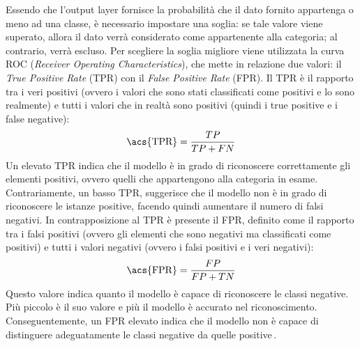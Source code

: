 Essendo che l'output layer fornisce la probabilità che il dato fornito appartenga o meno ad una classe, è necessario impostare una soglia: se tale valore viene superato, allora il dato verrà considerato come appartenente alla categoria; al contrario, verrà escluso. Per scegliere la soglia migliore viene utilizzata la curva \acs{ROC} (\textit{Receiver Operating Characteristics}), che mette in relazione due valori: il \textit{True Positive Rate} (\acs{TPR}) con il \textit{False Positive Rate} (\acs{FPR}). Il \acs{TPR} è il rapporto tra i veri positivi (ovvero i valori che sono stati classificati come positivi e lo sono realmente) e tutti i valori che in realtà sono positivi (quindi i true positive e i false negative):
% 
\begin{gather*}
    \text{\acs{TPR}} = \frac{TP}{TP + FN}
\end{gather*}
% 
\noindent Un elevato \acs{TPR} indica che il modello è in grado di riconoscere correttamente gli elementi positivi, ovvero quelli che appartengono alla categoria in esame. Contrariamente, un basso \acs{TPR}, suggerisce che il modello non è in grado di riconoscere le istanze positive, facendo quindi aumentare il numero di falsi negativi. In contrapposizione al \acs{TPR} è presente il \acs{FPR}, definito come il rapporto tra i falsi positivi (ovvero gli elementi che sono negativi ma classificati come positivi) e tutti i valori negativi (ovvero i falsi positivi e i veri negativi):
% 
\begin{gather*}
    \text{\acs{FPR}} = \frac{FP}{FP + TN}
\end{gather*}
% 
\noindent Questo valore indica quanto il modello è capace di riconoscere le classi negative. Più piccolo è il suo valore e più il modello è accurato nel riconoscimento. Conseguentemente, un \acs{FPR} elevato indica che il modello non è capace di distinguere adeguatamente le classi negative da quelle positive\,\cite{narkhede2018understanding}.

